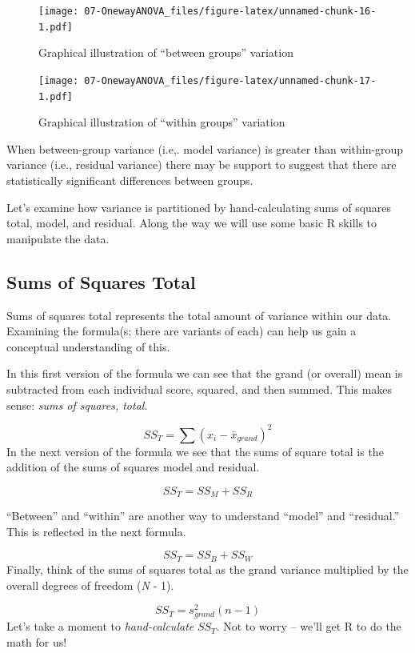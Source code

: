 \documentclass[
  11pt,
]{book}
\begin{document}
\begin{figure}
\centering
\texttt{[image: 07-OnewayANOVA\_files/figure-latex/unnamed-chunk-16-1.pdf]}
\caption{\label{fig:unnamed-chunk-16}Graphical illustration of ``between groups'' variation}
\end{figure}

\begin{figure}
\centering
\texttt{[image: 07-OnewayANOVA\_files/figure-latex/unnamed-chunk-17-1.pdf]}
\caption{\label{fig:unnamed-chunk-17}Graphical illustration of ``within groups'' variation}
\end{figure}

When between-group variance (i.e,. model variance) is greater than within-group variance (i.e., residual variance) there may be support to suggest that there are statistically significant differences between groups.

Let's examine how variance is partitioned by hand-calculating sums of squares total, model, and residual. Along the way we will use some basic R skills to manipulate the data.

\hypertarget{sums-of-squares-total}{%
\subsection{Sums of Squares Total}\label{sums-of-squares-total}}

Sums of squares total represents the total amount of variance within our data. Examining the formula(s; there are variants of each) can help us gain a conceptual understanding of this.

In this first version of the formula we can see that the grand (or overall) mean is subtracted from each individual score, squared, and then summed. This makes sense: \emph{sums of squares, total}.

\[SS_{T}= \sum (x_{i}-\bar{x}_{grand})^{2}\] In the next version of the formula we see that the sums of square total is the addition of the sums of squares model and residual.

\[SS_{T}= SS_{M} + SS_{R}\]

``Between'' and ``within'' are another way to understand ``model'' and ``residual.'' This is reflected in the next formula.

\[SS_{T}= SS_{B} + SS_{W}\] Finally, think of the sums of squares total as the grand variance multiplied by the overall degrees of freedom (\emph{N} - 1).

\[SS_{T}= s_{grand}^{2}(n-1)\] Let's take a moment to \emph{hand-calculate} \(SS_{T}\). Not to worry -- we'll get R to do the math for us!
\end{document}
